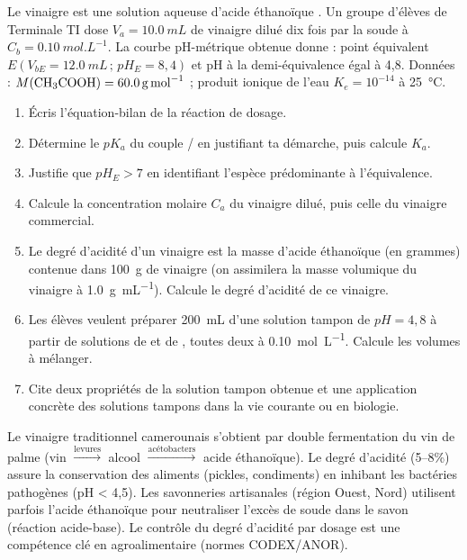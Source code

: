 \documentclass[11pt]{article}
\begin{document}
\begin{exercice}
Le vinaigre est une solution aqueuse d'acide éthanoïque . Un groupe d'élèves de Terminale TI dose $V_a = \SI{10,0}{mL}$ de vinaigre dilué dix fois par la soude à $C_b = \SI{0,10}{mol.L^{-1}}$. La courbe pH-métrique obtenue donne : point équivalent $E(V_{bE} = \SI{12,0}{mL}\,;\, pH_E = 8,4)$ et pH à la demi-équivalence égal à 4,8. Données : $M(\ce{CH3COOH}) = \SI{60,0}{g.mol^{-1}}$ ; produit ionique de l'eau $K_e = 10^{-14}$ à \SI{25}{\celsius}.

\begin{enumerate}
\item Écris l'équation-bilan de la réaction de dosage.
\item Détermine le $pK_a$ du couple / en justifiant ta démarche, puis calcule $K_a$.
\item Justifie que $pH_E > 7$ en identifiant l'espèce prédominante à l'équivalence.
\item Calcule la concentration molaire $C_a$ du vinaigre dilué, puis celle du vinaigre commercial.
\item Le degré d'acidité d'un vinaigre est la masse d'acide éthanoïque (en grammes) contenue dans \SI{100}{g} de vinaigre (on assimilera la masse volumique du vinaigre à \SI{1,0}{g.mL^{-1}}). Calcule le degré d'acidité de ce vinaigre.
\item Les élèves veulent préparer \SI{200}{mL} d'une solution tampon de $pH = 4,8$ à partir de solutions de  et de , toutes deux à \SI{0,10}{mol.L^{-1}}. Calcule les volumes à mélanger.
\item Cite deux propriétés de la solution tampon obtenue et une application concrète des solutions tampons dans la vie courante ou en biologie.
\end{enumerate}
\end{exercice}

\begin{savaistu}
Le vinaigre traditionnel camerounais s'obtient par double fermentation du vin de palme (vin $\xrightarrow{\text{levures}}$ alcool $\xrightarrow{\text{acétobacters}}$ acide éthanoïque). Le degré d'acidité (5--8\%) assure la conservation des aliments (pickles, condiments) en inhibant les bactéries pathogènes (pH < 4,5). Les savonneries artisanales (région Ouest, Nord) utilisent parfois l'acide éthanoïque pour neutraliser l'excès de soude dans le savon (réaction acide-base). Le contrôle du degré d'acidité par dosage est une compétence clé en agroalimentaire (normes CODEX/ANOR).
\end{savaistu}
\end{document}
